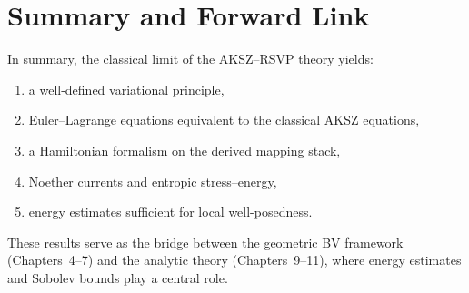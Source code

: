 \section{Summary and Forward Link}
\label{sec:summary}

In summary, the classical limit of the AKSZ--RSVP theory yields:
\begin{enumerate}
\item a well-defined variational principle,
\item Euler--Lagrange equations equivalent to the classical AKSZ equations,
\item a Hamiltonian formalism on the derived mapping stack,
\item Noether currents and entropic stress--energy,
\item energy estimates sufficient for local well-posedness.
\end{enumerate}
These results serve as the bridge between the geometric BV framework
(Chapters~4--7) and the analytic theory (Chapters~9--11),
where energy estimates and Sobolev bounds play a central role.

